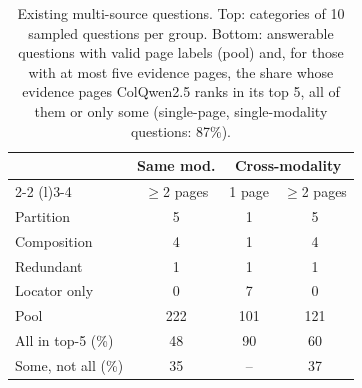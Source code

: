\begin{table}[t]
  \centering
  \small
  \setlength{\tabcolsep}{4pt}
  \caption{Existing multi-source questions. Top: categories of 10 sampled questions per group. Bottom: answerable questions with valid page labels (pool) and, for those with at most five evidence pages, the share whose evidence pages ColQwen2.5 ranks in its top 5, all of them or only some (single-page, single-modality questions: 87\%).}
  \label{tab:existing-categories}
  \begin{tabular}{@{}lccc@{}}
    \toprule
    & \multicolumn{1}{c}{Same mod.} & \multicolumn{2}{c}{Cross-modality} \\
    \cmidrule(lr){2-2} \cmidrule(l){3-4}
    & $\geq$2 pages & 1 page & $\geq$2 pages \\
    \midrule
    Partition & 5 & 1 & 5 \\
    Composition & 4 & 1 & 4 \\
    Redundant & 1 & 1 & 1 \\
    Locator only & 0 & 7 & 0 \\
    \midrule
    Pool & 222 & 101 & 121 \\
    All in top-5 (\%) & 48 & 90 & 60 \\
    Some, not all (\%) & 35 & -- & 37 \\
    \bottomrule
  \end{tabular}
\end{table}
